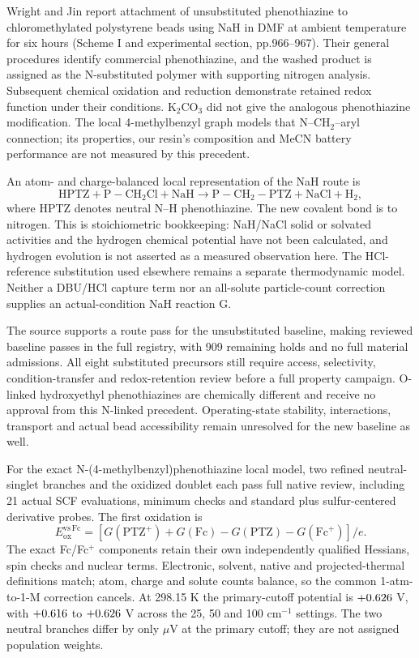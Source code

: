 \documentclass[11pt]{article}
\begin{document}
Wright and Jin report attachment of unsubstituted phenothiazine to chloromethylated polystyrene beads using NaH in DMF at ambient temperature for six hours (Scheme I and experimental section, pp.966--967).\cite{wright1989supported} Their general procedures identify commercial phenothiazine, and the washed product is assigned as the N-substituted polymer with supporting nitrogen analysis. Subsequent chemical oxidation and reduction demonstrate retained redox function under their conditions. K$_2$CO$_3$ did not give the analogous phenothiazine modification. The local 4-methylbenzyl graph models that N--CH$_2$--aryl connection; its properties, our resin's composition and MeCN battery performance are not measured by this precedent.

An atom- and charge-balanced local representation of the NaH route is
\begin{equation}
\mathrm{HPTZ+P{-}CH_2Cl+NaH\rightarrow P{-}CH_2{-}PTZ+NaCl+H_2},
\end{equation}
where HPTZ denotes neutral N--H phenothiazine. The new covalent bond is to nitrogen. This is stoichiometric bookkeeping: NaH/NaCl solid or solvated activities and the hydrogen chemical potential have not been calculated, and hydrogen evolution is not asserted as a measured observation here. The HCl-reference substitution used elsewhere remains a separate thermodynamic model. Neither a DBU/HCl capture term nor an all-solute particle-count correction supplies an actual-condition NaH reaction G.

The source supports a route pass for the unsubstituted baseline, making \ReviewedRouteCount{} reviewed baseline passes in the full registry, with 909 remaining holds and no full material admissions. All eight substituted precursors still require access, selectivity, condition-transfer and redox-retention review before a full property campaign. O-linked hydroxyethyl phenothiazines are chemically different and receive no approval from this N-linked precedent. Operating-state stability, interactions, transport and actual bead accessibility remain unresolved for the new baseline as well.

For the exact N-(4-methylbenzyl)phenothiazine local model, two refined neutral-singlet branches and the oxidized doublet each pass full native review, including 21 actual SCF evaluations, minimum checks and standard plus sulfur-centered derivative probes. The first oxidation is
\[
E_{\mathrm{ox}}^{\mathrm{vs\,Fc}}=[G(\mathrm{PTZ}^{+})+G(\mathrm{Fc})-G(\mathrm{PTZ})-G(\mathrm{Fc}^{+})]/e.
\]
The exact Fc/Fc$^+$ components retain their own independently qualified Hessians, spin checks and nuclear terms. Electronic, solvent, native and projected-thermal definitions match; atom, charge and solute counts balance, so the common 1-atm-to-1-M correction cancels. At 298.15 K the primary-cutoff potential is $+0.626$ V, with $+0.616$ to $+0.626$ V across the 25, 50 and 100 cm$^{-1}$ settings. The two neutral branches differ by only \PTZBranchMicroV{} $\mu$V at the primary cutoff; they are not assigned population weights.
\end{document}
